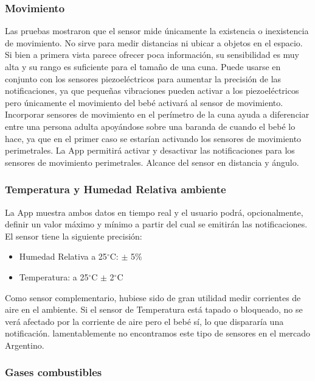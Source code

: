 \documentclass{IEEEtran}
\begin{document}
			\subsubsection{Movimiento}

				Las pruebas mostraron que el sensor mide únicamente la existencia o inexistencia de movimiento. No sirve para medir distancias ni ubicar a objetos en el espacio.
				Si bien a primera vista parece ofrecer poca información, su sensibilidad es muy alta y su rango es suficiente para el tamaño de una cuna. Puede usarse en conjunto con los sensores piezoeléctricos para aumentar la precisión de las notificaciones, ya que pequeñas vibraciones pueden activar a los piezoeléctricos pero únicamente el movimiento del bebé activará al sensor de movimiento.
Incorporar sensores de movimiento en el perímetro de la cuna ayuda a diferenciar entre una persona adulta apoyándose sobre una baranda de cuando el bebé lo hace, ya que en el primer caso se estarían activando los sensores de movimiento perimetrales.
				La App permitirá activar y desactivar las notificaciones para los sensores de movimiento perimetrales.
				Alcance del sensor en distancia y ángulo.

			\subsubsection{Temperatura y Humedad Relativa ambiente}

				La App muestra ambos datos en tiempo real y el usuario podrá, opcionalmente, definir un valor máximo y mínimo a partir del cual se emitirán las notificaciones.
				El sensor tiene la siguiente precisión:

				\begin{itemize}
					\item Humedad Relativa a 25$^\circ$C: $\pm$ 5\%
					\item Temperatura: a 25$^\circ$C $\pm$ 2$^\circ$C
				\end{itemize}

				Como sensor complementario, hubiese sido de gran utilidad medir corrientes de aire en el ambiente. Si el sensor de Temperatura está tapado o bloqueado, no se verá afectado por la corriente de aire pero el bebé sí, lo que dispararía una notificación. lamentablemente no encontramos este tipo de sensores en el mercado Argentino.

			\subsubsection{Gases combustibles}
\end{document}
